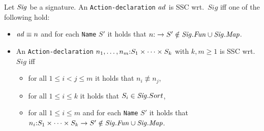 \documentclass[twoside,fleqn,a4paper,dvips]{article}
\newcommand{\Sig}{\nm{Sig}}
\newcommand{\Fun}{\nm{Fun}}
\begin{document}
\begin{defn}
Let $\Sig$ be a signature.
An {\tt Action-declaration} ${\it ad}$ is SSC wrt.\ $Sig$ iff one of the following
hold:
\begin{itemize}
\item
${\it ad}\equiv n$ and
for each {\tt Name} $S'$ it holds that $n\ap \rightarrow S' \notin
\Sig.\Fun\cup\Sig.\Map$.
\item
An {\tt Action-declaration} $n_1,\ldots,n_m{:} S_1\times \cdots \times
S_k$ with $k,m\geq 1$ is SSC wrt. $Sig$ iff
\begin{itemize}
\item
for all $1\leq i<j\leq m$ it holds that $n_i\not\equiv n_j$,
\item
for all $1\leq i\leq k$ it holds that $S_i\in \Sig.Sort$,
\item for all $1\leq i\leq m$ and for each
{\tt Name} $S'$
it holds that $n_i\ap S_1\times\cdots\times S_k\rightarrow S'\notin
\Sig.\Fun\cup\Sig.\Map$.
\end{itemize}
\end{itemize}
\end{defn}
\end{document}

